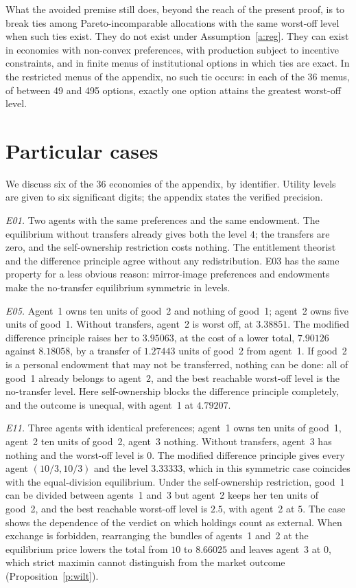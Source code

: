 \documentclass{situationist-preprint}
\begin{document}
What the avoided premise still does, beyond the reach of the present proof, is to break ties among Pareto-incomparable allocations with the same worst-off level when such ties exist. They do not exist under Assumption~\ref{a:reg}. They can exist in economies with non-convex preferences, with production subject to incentive constraints, and in finite menus of institutional options in which ties are exact. In the restricted menus of the appendix, no such tie occurs: in each of the 36 menus, of between 49 and 495 options, exactly one option attains the greatest worst-off level.

\section{Particular cases}\label{s:cases}

We discuss six of the 36 economies of the appendix, by identifier. Utility levels are given to six significant digits; the appendix states the verified precision.

\emph{E01.} Two agents with the same preferences and the same endowment. The equilibrium without transfers already gives both the level $4$; the transfers are zero, and the self-ownership restriction costs nothing. The entitlement theorist and the difference principle agree without any redistribution. E03 has the same property for a less obvious reason: mirror-image preferences and endowments make the no-transfer equilibrium symmetric in levels.

\emph{E05.} Agent~1 owns ten units of good~2 and nothing of good~1; agent~2 owns five units of good~1. Without transfers, agent~2 is worst off, at $3.38851$. The modified difference principle raises her to $3.95063$, at the cost of a lower total, $7.90126$ against $8.18058$, by a transfer of $1.27443$ units of good~2 from agent~1. If good~2 is a personal endowment that may not be transferred, nothing can be done: all of good~1 already belongs to agent~2, and the best reachable worst-off level is the no-transfer level. Here self-ownership blocks the difference principle completely, and the outcome is unequal, with agent~1 at $4.79207$.

\emph{E11.} Three agents with identical preferences; agent~1 owns ten units of good~1, agent~2 ten units of good~2, agent~3 nothing. Without transfers, agent~3 has nothing and the worst-off level is $0$. The modified difference principle gives every agent $(10/3, 10/3)$ and the level $3.33333$, which in this symmetric case coincides with the equal-division equilibrium. Under the self-ownership restriction, good~1 can be divided between agents~1 and~3 but agent~2 keeps her ten units of good~2, and the best reachable worst-off level is $2.5$, with agent~2 at $5$. The case shows the dependence of the verdict on which holdings count as external. When exchange is forbidden, rearranging the bundles of agents~1 and~2 at the equilibrium price lowers the total from $10$ to $8.66025$ and leaves agent~3 at $0$, which strict maximin cannot distinguish from the market outcome (Proposition~\ref{p:wilt}).
\end{document}
